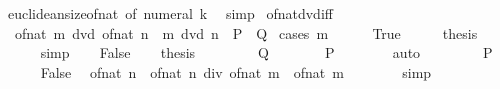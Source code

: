 \begin{isabellebody}
\endisadelimproof
%
\isatagproof
{}\isamarkupfalse%
\ euclidean{\isacharunderscore}{\kern0pt}size{\isacharunderscore}{\kern0pt}of{\isacharunderscore}{\kern0pt}nat\ {\isacharbrackleft}{\kern0pt}of\ {\isachardoublequoteopen}numeral\ k{\isachardoublequoteclose}{\isacharbrackright}{\kern0pt}\ \isamarkupfalse%
\ simp%
\endisatagproof
{\isafoldproof}%
%
\isadelimproof
\isanewline
%
\endisadelimproof
\isanewline
{}\isamarkupfalse%
\ of{\isacharunderscore}{\kern0pt}nat{\isacharunderscore}{\kern0pt}dvd{\isacharunderscore}{\kern0pt}iff{\isacharcolon}{\kern0pt}\isanewline
\ \ {\isachardoublequoteopen}of{\isacharunderscore}{\kern0pt}nat\ m\ dvd\ of{\isacharunderscore}{\kern0pt}nat\ n\ {\isasymlongleftrightarrow}\ m\ dvd\ n{\isachardoublequoteclose}\ {\isacharparenleft}{\kern0pt}\ {\isachardoublequoteopen}{\isacharquery}{\kern0pt}P\ {\isasymlongleftrightarrow}\ {\isacharquery}{\kern0pt}Q{\isachardoublequoteclose}{\isacharparenright}{\kern0pt}\isanewline
%
\isadelimproof
%
\endisadelimproof
%
\isatagproof
{}\isamarkupfalse%
\ {\isacharparenleft}{\kern0pt}cases\ {\isachardoublequoteopen}m\ {\isacharequal}{\kern0pt}\ {}{\isachardoublequoteclose}{\isacharparenright}{\kern0pt}\isanewline
\ \ \isamarkupfalse%
\ True\isanewline
\ \ \isamarkupfalse%
\ \isamarkupfalse%
\ {\isacharquery}{\kern0pt}thesis\isanewline
\ \ \ \ \isamarkupfalse%
\ simp\isanewline
{}\isamarkupfalse%
\isanewline
\ \ \isamarkupfalse%
\ False\isanewline
\ \ \isamarkupfalse%
\ {\isacharquery}{\kern0pt}thesis\isanewline
\ \ \isamarkupfalse%
\isanewline
\ \ \ \ \isamarkupfalse%
\ {\isacharquery}{\kern0pt}Q\isanewline
\ \ \ \ \isamarkupfalse%
\ \isamarkupfalse%
\ {\isacharquery}{\kern0pt}P\isanewline
\ \ \ \ \ \ \isamarkupfalse%
\ auto\isanewline
\ \ \isamarkupfalse%
\isanewline
\ \ \ \ \isamarkupfalse%
\ {\isacharquery}{\kern0pt}P\isanewline
\ \ \ \ \isamarkupfalse%
\ False\ \isamarkupfalse%
\ {\isachardoublequoteopen}of{\isacharunderscore}{\kern0pt}nat\ n\ {\isacharequal}{\kern0pt}\ of{\isacharunderscore}{\kern0pt}nat\ n\ div\ of{\isacharunderscore}{\kern0pt}nat\ m\ {\isacharasterisk}{\kern0pt}\ of{\isacharunderscore}{\kern0pt}nat\ m{\isachardoublequoteclose}\isanewline
\ \ \ \ \ \ \isamarkupfalse%
\ simp\isanewline
\ \ \ \ \isamarkupfalse%

\end{isabellebody}

